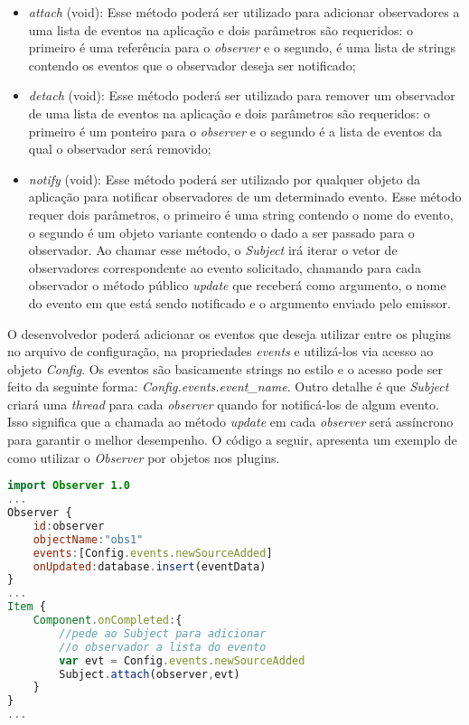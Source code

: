 \begin{itemize}
	\item \textit{attach} (void): Esse método poderá ser utilizado para adicionar observadores a uma lista de eventos na aplicação e dois parâmetros são requeridos: o primeiro é uma referência para o \textit{observer} e o segundo, é uma lista de strings contendo os eventos que o observador deseja ser notificado;

	\item \textit{detach} (void): Esse método poderá ser utilizado para remover um observador de uma lista de eventos na aplicação e dois parâmetros são requeridos: o primeiro é um ponteiro para o \textit{observer} e o segundo é a lista de eventos da qual o observador será removido;

	\item \textit{notify} (void): Esse método poderá ser utilizado por qualquer objeto da aplicação para notificar observadores de um determinado evento. Esse método requer dois parâmetros, o primeiro é uma string contendo o nome do evento, o segundo é um objeto variante contendo o dado a ser passado para o observador. Ao chamar esse método, o \textit{Subject} irá iterar o vetor de observadores correspondente ao evento solicitado, chamando para cada observador o método público \textit{update} que receberá como argumento, o nome do evento em que está sendo notificado e o argumento enviado pelo emissor.
\end{itemize}

O desenvolvedor poderá adicionar os eventos que deseja utilizar entre os plugins no arquivo de configuração, na propriedades \textit{events} e utilizá-los via acesso ao objeto \textit{Config}. Os eventos são basicamente strings no estilo e o acesso pode ser feito da seguinte forma: \textit{Config.events.event\_name}. Outro detalhe é que \textit{Subject} criará uma \textit{thread} para cada \textit{observer} quando for notificá-los de algum evento. Isso significa que a chamada ao método \textit{update} em cada \textit{observer} será assíncrono para garantir o melhor desempenho. O código a seguir, apresenta um exemplo de como utilizar o \textit{Observer} por objetos nos plugins.

\begin{center}
\begin{lstlisting}[language=qml]
import Observer 1.0
...
Observer {
	id:observer
	objectName:"obs1"
	events:[Config.events.newSourceAdded]
	onUpdated:database.insert(eventData)
}
...
Item {
	Component.onCompleted:{
		//pede ao Subject para adicionar
		//o observador a lista do evento
		var evt = Config.events.newSourceAdded
		Subject.attach(observer,evt)
	}
}
...
\end{lstlisting}
\end{center}

